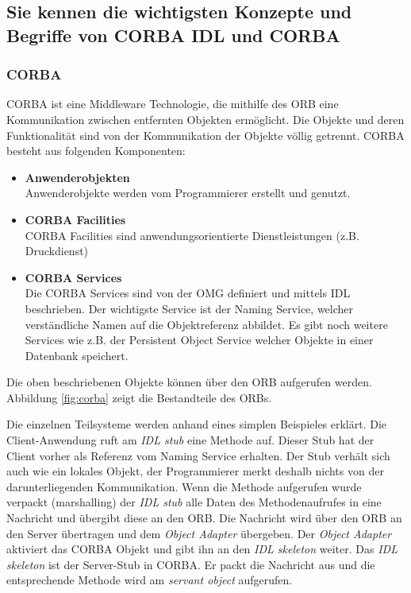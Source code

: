 \subsection{Sie kennen die wichtigsten Konzepte und Begriffe von CORBA IDL und CORBA}

\subsubsection{CORBA}

CORBA ist eine Middleware Technologie, die mithilfe des \ac{ORB} eine Kommunikation zwischen entfernten Objekten ermöglicht. Die Objekte und deren Funktionalität sind von der Kommunikation der Objekte völlig getrennt. CORBA besteht aus folgenden Komponenten:
\begin{itemize}
	\item \textbf{Anwenderobjekten} \\
		  Anwenderobjekte werden vom Programmierer erstellt und genutzt.
	\item \textbf{CORBA Facilities} \\
		  CORBA Facilities sind anwendungsorientierte Dienstleistungen (z.B. Druckdienst)
	\item \textbf{CORBA Services} \\
		  Die CORBA Services sind von der \ac{OMG} definiert und mittels IDL beschrieben. Der wichtigste Service ist der Naming Service, welcher verständliche Namen auf die Objektreferenz abbildet. Es gibt noch weitere Services wie z.B. der Persistent Object Service welcher Objekte in einer Datenbank speichert.
\end{itemize}
Die oben beschriebenen Objekte können über den \ac{ORB} aufgerufen werden. Abbildung \ref{fig:corba} zeigt die Bestandteile des \acp{ORB}.


Die einzelnen Teilsysteme werden anhand eines simplen Beispieles erklärt. Die Client-Anwendung ruft am \emph{IDL stub} eine Methode auf. Dieser Stub hat der Client vorher als Referenz vom Naming Service erhalten. Der Stub verhält sich auch wie ein lokales Objekt, der Programmierer merkt deshalb nichts von der darunterliegenden Kommunikation. Wenn die Methode aufgerufen wurde verpackt (marshalling) der \emph{IDL stub} alle Daten des Methodenaufrufes in eine Nachricht und übergibt diese an den \ac{ORB}. Die Nachricht wird über den \ac{ORB} an den Server übertragen und dem \emph{Object Adapter} übergeben. Der \emph{Object Adapter} aktiviert das CORBA Objekt und gibt ihn an den \emph{IDL skeleton} weiter. Das \emph{IDL skeleton} ist der Server-Stub in CORBA. Er packt die Nachricht aus und die entsprechende Methode wird am \emph{servant object} aufgerufen.

